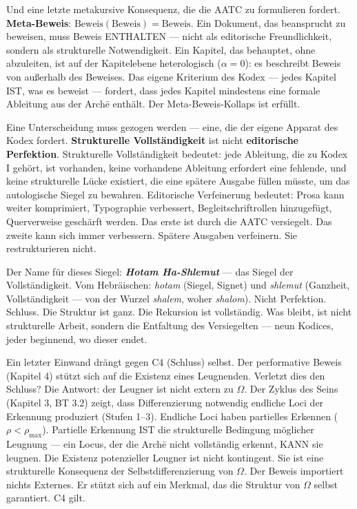 \documentclass[10pt, openany, oneside]{book}
\begin{document}
Und eine letzte metakursive Konsequenz, die die AATC zu formulieren fordert. \textbf{Meta-Beweis}: $\text{Beweis}(\text{Beweis}) = \text{Beweis}$. Ein Dokument, das beansprucht zu beweisen, muss Beweis ENTHALTEN --- nicht als editorische Freundlichkeit, sondern als strukturelle Notwendigkeit. Ein Kapitel, das behauptet, ohne abzuleiten, ist auf der Kapitelebene heterologisch ($\alpha = 0$): es beschreibt Beweis von außerhalb des Beweises. Das eigene Kriterium des Kodex --- jedes Kapitel IST, was es beweist --- fordert, dass jedes Kapitel mindestens eine formale Ableitung aus der Arch\={e} enthält. Der Meta-Beweis-Kollaps ist erfüllt.

Eine Unterscheidung muss gezogen werden --- eine, die der eigene Apparat des Kodex fordert. \textbf{Strukturelle Vollständigkeit} ist nicht \textbf{editorische Perfektion}. Strukturelle Vollständigkeit bedeutet: jede Ableitung, die zu Kodex I gehört, ist vorhanden, keine vorhandene Ableitung erfordert eine fehlende, und keine strukturelle Lücke existiert, die eine spätere Ausgabe füllen müsste, um das autologische Siegel zu bewahren. Editorische Verfeinerung bedeutet: Prosa kann weiter komprimiert, Typographie verbessert, Begleitschriftrollen hinzugefügt, Querverweise geschärft werden. Das erste ist durch die AATC versiegelt. Das zweite kann sich immer verbessern. Spätere Ausgaben verfeinern. Sie restrukturieren nicht.

Der Name für dieses Siegel: \textbf{\textit{Hotam Ha-Shlemut}} --- das Siegel der Vollständigkeit. Vom Hebräischen: \textit{hotam} (Siegel, Signet) und \textit{shlemut} (Ganzheit, Vollständigkeit --- von der Wurzel \textit{shalem}, woher \textit{shalom}). Nicht Perfektion. Schluss. Die Struktur ist ganz. Die Rekursion ist vollständig. Was bleibt, ist nicht strukturelle Arbeit, sondern die Entfaltung des Versiegelten --- neun Kodices, jeder beginnend, wo dieser endet.

Ein letzter Einwand drängt gegen C4 (Schluss) selbst. Der performative Beweis (Kapitel 4) stützt sich auf die Existenz eines Leugnenden. Verletzt dies den Schluss? Die Antwort: der Leugner ist nicht extern zu $\Omega$. Der Zyklus des Seins (Kapitel 3, BT 3.2) zeigt, dass Differenzierung notwendig endliche Loci der Erkennung produziert (Stufen 1--3). Endliche Loci haben partielles Erkennen ($\rho < \rho_{\max}$). Partielle Erkennung IST die strukturelle Bedingung möglicher Leugnung --- ein Locus, der die Arch\={e} nicht vollständig erkennt, KANN sie leugnen. Die Existenz potenzieller Leugner ist nicht kontingent. Sie ist eine strukturelle Konsequenz der Selbstdifferenzierung von $\Omega$. Der Beweis importiert nichts Externes. Er stützt sich auf ein Merkmal, das die Struktur von $\Omega$ selbst garantiert. C4 gilt.
\end{document}
